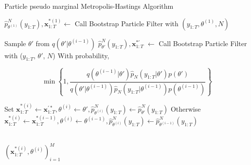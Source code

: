 \documentclass[11pt,a4,twosided,singlespacing,titlepagenumber=on]{scrreprt}
\numberwithin{equation}{chapter} %
\theoremstyle{remark}
\newcommand{\matr}[1]{\mathbf{#1}}
\begin{document}
\begin{algorithm}[H]
\caption{Particle pseudo marginal Metropolis-Hastings Algorithm}\label{algo_pmcmc}
\begin{algorithmic}[1]

\State $\hat{p}^N_{\theta^{(1)}}(y_{1:T}), \matr{x}^{*(1)}_{1:T} \gets$ Call Bootstrap Particle Filter with $(y_{1:T}, \theta^{(1)}, N)$

	\State Sample $\theta'$ from $q(\theta'|\theta^{(i-1)})$
	\State $\hat{p}^N_{\theta'}(y_{1:T}), \matr{x}^{*'}_{1:T}$ $ \gets$ Call Bootstrap Particle Filter with ($y_{1:T}$, $\theta'$, $N$)
	\State With probability,
	
	$$\min \left\{1, \frac{q(\theta^{(i-1)}|\theta')\hat{p}_N(y_{1:T}|\theta')p(\theta')}{q(\theta'|\theta^{(i-1)})\hat{p}_N(y_{1:T}|\theta^{(i-1)})p(\theta^{(i-1)})}  \right\} $$
	
	\State Set $\matr{x}^{*(i)}_{1:T} \gets \matr{x}^{'*}_{1:T},\theta^{(i)} \gets \theta', \hat{p}^N_{\theta^{(i)}}(y_{1:T}) \gets \hat{p}^N_{\theta'}(y_{1:T})$
	\State Otherwise $\matr{x}^{*(i)}_{1:T} \gets \matr{x}^{*(i-1)}_{1:T},\theta^{(i)} \gets \theta^{(i-1)}, \hat{p}^N_{\theta^{(i)}}(y_{1:T}) \gets \hat{p}^N_{\theta^{(i-1)}}(y_{1:T})$
	
\\
\EndProcedure
\Return $(\matr{x}^{*(i)}_{1:T}, \theta^{(i)})_{i=1}^M$

\end{algorithmic}
\end{algorithm}
\end{document}
